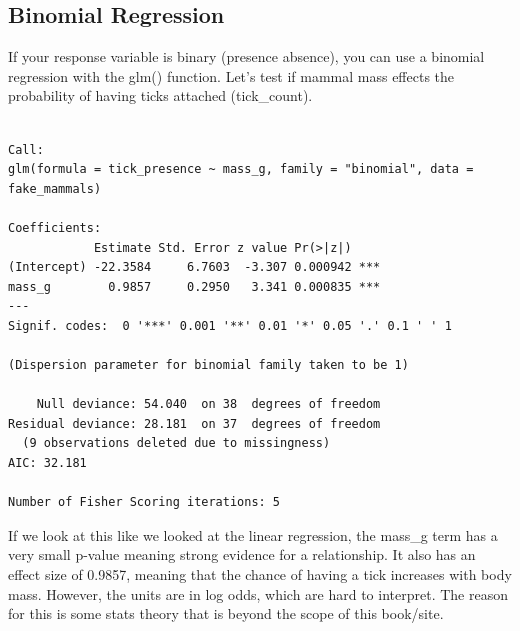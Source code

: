 \documentclass[
  letterpaper,
  DIV=11,
  numbers=noendperiod]{scrreprt}
\newenvironment{Shaded}{\begin{snugshade}}{\end{snugshade}}
\newcommand{\AttributeTok}[1]{\textcolor[rgb]{0.40,0.45,0.13}{#1}}
\newcommand{\DecValTok}[1]{\textcolor[rgb]{0.68,0.00,0.00}{#1}}
\newcommand{\DocumentationTok}[1]{\textcolor[rgb]{0.37,0.37,0.37}{\textit{#1}}}
\newcommand{\FunctionTok}[1]{\textcolor[rgb]{0.28,0.35,0.67}{#1}}
\newcommand{\NormalTok}[1]{\textcolor[rgb]{0.00,0.23,0.31}{#1}}
\newcommand{\OtherTok}[1]{\textcolor[rgb]{0.00,0.23,0.31}{#1}}
\newcommand{\SpecialCharTok}[1]{\textcolor[rgb]{0.37,0.37,0.37}{#1}}
\newcommand{\StringTok}[1]{\textcolor[rgb]{0.13,0.47,0.30}{#1}}
\begin{document}
\subsection{Binomial Regression}\label{binomial-regression}

If your response variable is binary (presence absence), you can use a
binomial regression with the glm() function. Let's test if mammal mass
effects the probability of having ticks attached (tick\_count).

\begin{Shaded}
\end{Shaded}

\begin{verbatim}

Call:
glm(formula = tick_presence ~ mass_g, family = "binomial", data = fake_mammals)

Coefficients:
            Estimate Std. Error z value Pr(>|z|)    
(Intercept) -22.3584     6.7603  -3.307 0.000942 ***
mass_g        0.9857     0.2950   3.341 0.000835 ***
---
Signif. codes:  0 '***' 0.001 '**' 0.01 '*' 0.05 '.' 0.1 ' ' 1

(Dispersion parameter for binomial family taken to be 1)

    Null deviance: 54.040  on 38  degrees of freedom
Residual deviance: 28.181  on 37  degrees of freedom
  (9 observations deleted due to missingness)
AIC: 32.181

Number of Fisher Scoring iterations: 5
\end{verbatim}

If we look at this like we looked at the linear regression, the mass\_g
term has a very small p-value meaning strong evidence for a
relationship. It also has an effect size of 0.9857, meaning that the
chance of having a tick increases with body mass. However, the units are
in log odds, which are hard to interpret. The reason for this is some
stats theory that is beyond the scope of this book/site.
\end{document}
